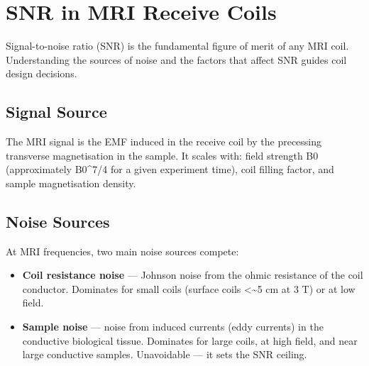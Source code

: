 \section{SNR in MRI Receive Coils}\label{sec:wiki_coil_snr}



Signal-to-noise ratio (SNR) is the fundamental figure of merit of any MRI coil. Understanding the sources of noise and the factors that affect SNR guides coil design decisions.


				

\subsection{Signal Source}

				

The MRI signal is the EMF induced in the receive coil by the precessing transverse magnetisation in the sample. It scales with: field strength B0 (approximately B0\textasciicircum{}7/4 for a given experiment time), coil filling factor, and sample magnetisation density.


				

\subsection{Noise Sources}

				

At MRI frequencies, two main noise sources compete:

				
\begin{itemize}

					\item \textbf{Coil resistance noise} — Johnson noise from the ohmic resistance of the coil conductor. Dominates for small coils (surface coils \textless{}\textasciitilde{}5 cm at 3 T) or at low field.

					\item \textbf{Sample noise} — noise from induced currents (eddy currents) in the conductive biological tissue. Dominates for large coils, at high field, and near large conductive samples. Unavoidable — it sets the SNR ceiling.

				
\end{itemize}


